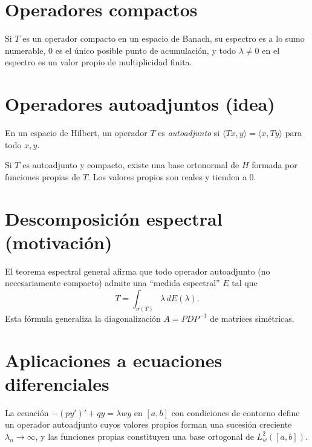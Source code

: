 \section{Operadores compactos}

\begin{theorem}
\label{teo:riesz-schauder}
Si $T$ es un operador compacto en un espacio de Banach, su espectro es a lo sumo numerable, $0$ es el único posible punto de acumulación, y todo $\lambda\neq 0$ en el espectro es un valor propio de multiplicidad finita.
\end{theorem}

\section{Operadores autoadjuntos (idea)}

\begin{definition}
\label{def:autoadjunto}
En un espacio de Hilbert, un operador $T$ es \emph{autoadjunto} si $\langle Tx,y\rangle=\langle x,Ty\rangle$ para todo $x,y$.
\end{definition}

\begin{theorem}
\label{teo:espectral-compacto}
Si $T$ es autoadjunto y compacto, existe una base ortonormal de $H$ formada por funciones propias de $T$. Los valores propios son reales y tienden a $0$.
\end{theorem}

\section{Descomposición espectral (motivación)}

El teorema espectral general afirma que todo operador autoadjunto (no necesariamente compacto) admite una ``medida espectral'' $E$ tal que
\[
  T=\int_{\sigma(T)}\lambda\,dE(\lambda).
\]
Esta fórmula generaliza la diagonalización $A=PDP^{-1}$ de matrices simétricas.

\section{Aplicaciones a ecuaciones diferenciales}

\begin{example}
\label{ej:sturm-liouville}
La ecuación $-(py')'+qy=\lambda w y$ en $[a,b]$ con condiciones de contorno define un operador autoadjunto cuyos valores propios forman una sucesión creciente $\lambda_n\to\infty$, y las funciones propias constituyen una base ortogonal de $L^2_w([a,b])$.
\end{example}

